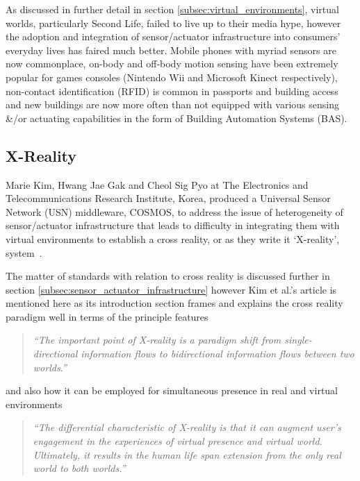 As discussed in further detail in section \ref{subsec:virtual_environments}, virtual worlds, particularly Second Life, failed to live up to their media hype, however the adoption and integration of sensor/actuator infrastructure into consumers' everyday lives has faired much better. Mobile phones with myriad sensors are now commonplace, on-body and off-body motion sensing have been extremely popular for games consoles (Nintendo Wii and Microsoft Kinect respectively), non-contact identification (RFID) is common in passports and building access and new buildings are now more often than not equipped with various sensing \&/or actuating capabilities in the form of Building Automation Systems (BAS).

\subsection{X-Reality}
\label{subsec:x-reality}
Marie Kim, Hwang Jae Gak and Cheol Sig Pyo at The Electronics and Telecommunications Research Institute, Korea, produced a Universal Sensor Network (USN) middleware, COSMOS, to address the issue of heterogeneity of sensor/actuator infrastructure that leads to difficulty in integrating them with virtual environments to establish a cross reality, or as they write it `X-reality', system~\cite{kim:practical}.

The matter of standards with relation to cross reality is discussed further in section \ref{subsec:sensor_actuator_infrastructure} however Kim et al.'s article is mentioned here as its introduction section frames and explains the cross reality paradigm well in terms of the principle features

\begin{quote}
\textit{``The important point of X-reality is a paradigm shift from single-directional information flows to bidirectional information flows between two worlds.''}
\end{quote}

and also how it can be employed for simultaneous presence in real and virtual environments

\begin{quote}
\textit{``The differential characteristic of X-reality is that it can augment user's engagement in the experiences of virtual presence and virtual world. Ultimately, it results in the human life span extension from the only real world to both worlds.''}
\end{quote}

